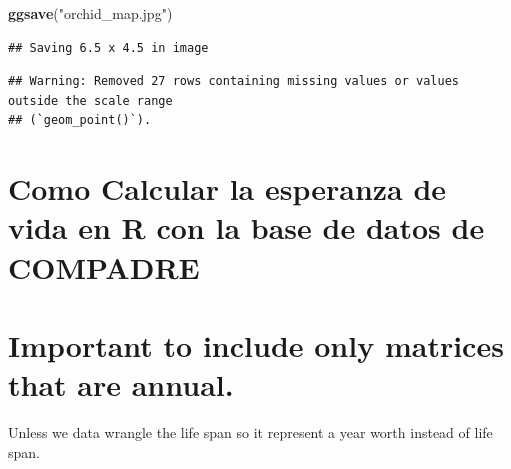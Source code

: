 \documentclass[
]{book}
\newenvironment{Shaded}{\begin{snugshade}}{\end{snugshade}}
\newcommand{\FunctionTok}[1]{\textcolor[rgb]{0.13,0.29,0.53}{\textbf{#1}}}
\newcommand{\NormalTok}[1]{#1}
\newcommand{\StringTok}[1]{\textcolor[rgb]{0.31,0.60,0.02}{#1}}
\theoremstyle{definition}
\theoremstyle{definition}
\theoremstyle{definition}
\theoremstyle{definition}
\theoremstyle{remark}
\begin{document}
\begin{Shaded}
\begin{Highlighting}[]
\FunctionTok{ggsave}\NormalTok{(}\StringTok{"orchid\_map.jpg"}\NormalTok{)}
\end{Highlighting}
\end{Shaded}

\begin{verbatim}
## Saving 6.5 x 4.5 in image
\end{verbatim}

\begin{verbatim}
## Warning: Removed 27 rows containing missing values or values outside the scale range
## (`geom_point()`).
\end{verbatim}

\section{Como Calcular la esperanza de vida en R con la base de datos de COMPADRE}\label{como-calcular-la-esperanza-de-vida-en-r-con-la-base-de-datos-de-compadre}

\section{Important to include only matrices that are annual.}\label{important-to-include-only-matrices-that-are-annual.}

Unless we data wrangle the life span so it represent a year worth instead of life span.
\end{document}
